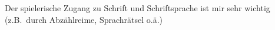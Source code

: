 Der spielerische Zugang zu Schrift und Schriftsprache ist mir sehr wichtig (z.B.\ durch Abzählreime, Sprachrätsel o.ä.)